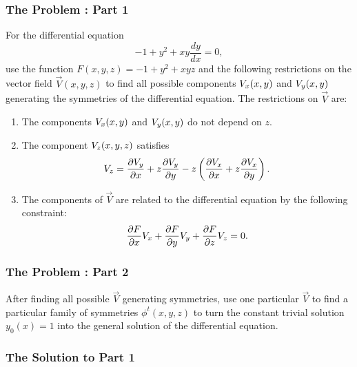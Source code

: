 \subsubsection*{The Problem : Part 1}
For the differential equation
\begin{equation}
-1 + y^2 + xy\frac{dy}{dx} = 0,
\end{equation}
use the function \(F(x,y,z) = -1 + y^2 + xyz\) and the following restrictions on the vector 
field \(\vec V(x,y,z)\) to find all possible components \(V_x(x,y)\) and \(V_y(x,y)\) generating the symmetries of the differential
equation. The restrictions on \(\vec V\) are:
\begin{enumerate}
\item The components \(V_x(x,y)\) and \(V_y(x,y)\) do not depend on \(z\). 
\item The component \(V_z(x,y,z)\) satisfies
\begin{equation}
V_z =  \frac{\partial V_y}{\partial x} + z \frac{\partial V_y}{\partial y} 
        - z\left( \frac{\partial V_x}{\partial x} + z \frac{\partial V_x}{\partial y}\right).
\end{equation}
\item The components of \(\vec V\) are related to the differential equation by the following constraint: 
\begin{equation}
\frac{\partial F}{\partial x}V_x + \frac{\partial F}{\partial y}V_y +  \frac{\partial F}{\partial z} V_z = 0.
\end{equation} 
\end{enumerate}

\subsubsection*{The Problem : Part 2}

After finding all possible \(\vec V\) generating symmetries, use one particular \(\vec V\) to find a particular
family of symmetries \(\phi^t (x,y,z)\) to turn the constant trivial solution \(y_0(x) = 1\) into
the general solution of the differential equation.

\subsubsection*{The Solution to Part 1}

